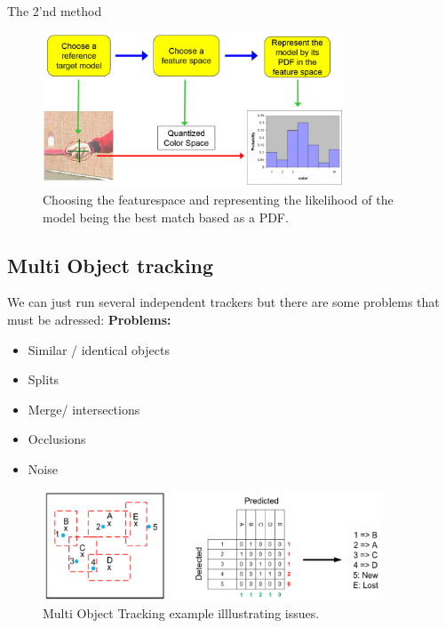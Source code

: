 \documentclass[a4paper]{article}
\begin{document}
The 2'nd method

\begin{figure}[H]
\centering
\includegraphics[width=0.8\textwidth]{figures/mean_shift_histogram_likelihood.png}
\caption{Choosing the featurespace and representing the likelihood of the model being the best match based as a PDF.}
\label{fig:histogram_likelihood}
\end{figure} 

\newpage
\subsection{Multi Object tracking}
We can just run several independent trackers but there are some problems that must be adressed:
\textbf{Problems:} 
\begin{itemize}
	\item Similar / identical objects
	\item Splits
	\item Merge/ intersections
	\item Occlusions
	\item Noise
\end{itemize}

\begin{figure}[H]
\centering
\includegraphics[width=0.9\textwidth]{figures/MOT_example.png}
\caption{Multi Object Tracking example illlustrating issues. }
\label{fig:MOT_example}
\end{figure} 
\end{document}
